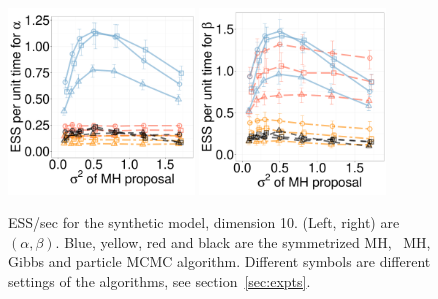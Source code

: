   \begin{figure}[H]
  \centering
  \begin{minipage}[h!]{0.65\linewidth}
  \centering
    \includegraphics [width=0.44\textwidth, angle=0]{figs/new_whole_exp_figs/exp_alpha_dim10.pdf}
    \includegraphics [width=0.44\textwidth, angle=0]{figs/new_whole_exp_figs/exp_beta_dim10.pdf}
  \end{minipage}
  \begin{minipage}[!hp]{0.33\linewidth}
    \caption{ESS/sec for the synthetic  model, dimension 10. (Left, right) 
      are $(\alpha, \beta)$. Blue, yellow, red and black are the symmetrized MH,
  \naive\ MH, Gibbs and particle MCMC algorithm. Different symbols are
different settings of the algorithms, see section~\ref{sec:expts}.}
     \label{fig:ESS_EXP_D1010}
  \end{minipage}
  \end{figure}

